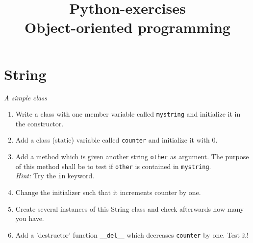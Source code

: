 \documentclass[12pt]{article}
\title{Python-exercises\\ Object-oriented programming}
\begin{document}

\maketitle

\section{String}
\textit{A simple class}
\begin{enumerate}
\item Write a class with one member variable called \texttt{mystring} and
  initialize it in the constructor.
\item Add a class (static) variable called \texttt{counter} and initialize it
  with 0.
\item Add a method which is given another string \texttt{other} as argument. The purpose of this method shall be to test if \texttt{other} is contained in \texttt{mystring}.\\
\textit{Hint:} Try the \texttt{in} keyword.
\item Change the initializer such that it increments counter by one.
\item Create several instances of this String class and check afterwards how
  many you have.
\item Add a 'destructor' function \texttt{\_\_del\_\_} which decreases
  \texttt{counter} by one. Test it!
\end{enumerate}
\end{document}
